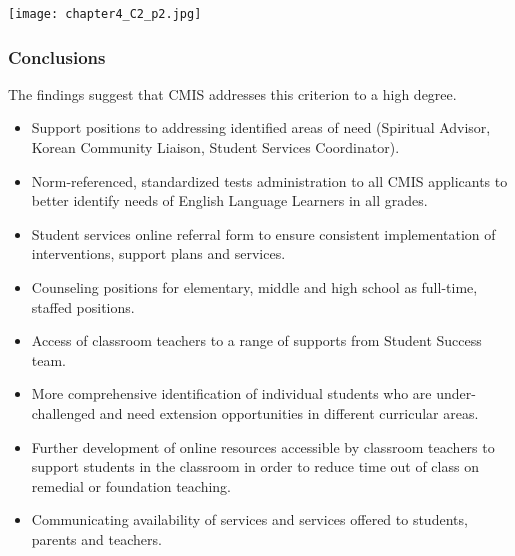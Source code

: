 {\centering\texttt{[image: chapter4\_C2\_p2.jpg]}}

\subsubsection{Conclusions}

\begin{findings}
The findings suggest that CMIS addresses this criterion to a high degree.

\begin{itemize}
\item Support positions to addressing identified areas of need (Spiritual Advisor, Korean Community Liaison, Student Services Coordinator).
\item Norm-referenced, standardized tests administration to all CMIS applicants to better identify needs of English Language Learners in all grades.
\item Student services online referral form to ensure consistent implementation of interventions, support plans and services.
\item Counseling positions for elementary, middle and high school as full-time, staffed positions.
\item Access of classroom teachers to a range of supports from Student Success team.
\end{itemize}

\begin{itemize}
\item More comprehensive identification of individual students who are under-challenged and need  extension opportunities in different curricular areas.
\item Further development of online resources accessible by classroom teachers to support students in the classroom in order to reduce time out of class on remedial or foundation teaching.
\item Communicating availability of services and services offered to students, parents and teachers.
\end{itemize}
\end{findings}
